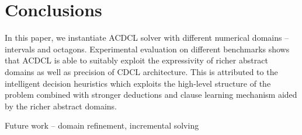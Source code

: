 \section{Conclusions}
In this paper, we instantiate ACDCL solver with different numerical domains -- 
intervals and octagons.  Experimental evaluation on different benchmarks shows that
ACDCL is able to suitably exploit the expressivity of richer
abstract domains as well as precision of CDCL architecture.
This is attributed to the intelligent decision heuristics
which exploits the high-level structure of the problem
combined with stronger deductions and clause learning
mechanism aided by the richer abstract domains.

Future work -- domain refinement, incremental solving
